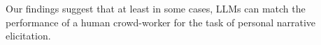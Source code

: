 
Our findings suggest that at least in some cases, LLMs can match the performance of a human crowd-worker for the task of personal narrative elicitation.




